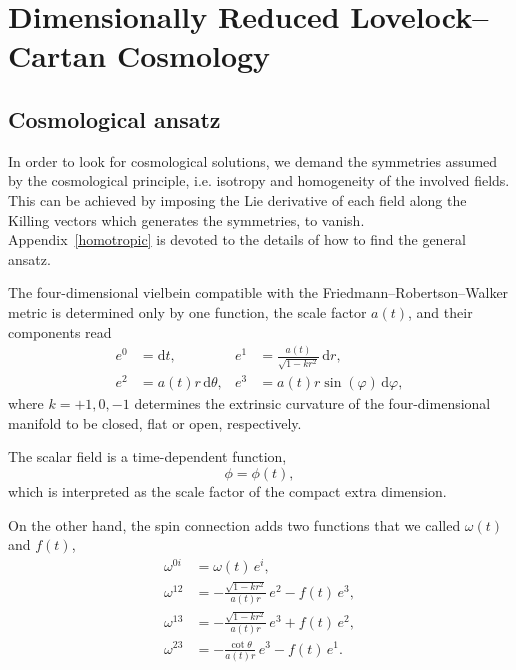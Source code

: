 \documentclass[aps,prd,12pt,superscriptaddress,showpacs,showkeys,longbibliography,reprint,nofootinbib]{revtex4-1}
\begin{document}
\section{Dimensionally Reduced Lovelock--Cartan Cosmology\label{cosmos}}

\subsection{Cosmological ansatz}

In order to look for cosmological solutions, we demand the symmetries assumed by the cosmological principle, i.e. isotropy and homogeneity of the involved fields. This can be achieved by imposing the Lie derivative of each field along the Killing vectors which generates the symmetries, to vanish. Appendix~\ref{homotropic} is devoted to the details of how to find the general ansatz.

The four-dimensional vielbein compatible with the Friedmann--Robertson--Walker metric is determined only by one function, the scale factor $a(t)$, and their components read
\begin{equation}
  \begin{aligned}
    \label{vielbein cosmo}
    e^0&=\mbox{d}t, & e^1&=\frac{a(t)}{\sqrt{1-kr^2}} \, \mbox{d}r,\\
    e^2&=a(t)r \, \mbox{d}\theta, & e^3&=a(t) r \sin(\varphi) \,\mbox{d}\varphi, 
  \end{aligned}
\end{equation}
where $k=+1,0,-1$ determines the extrinsic curvature of the four-dimensional manifold to be closed, flat or open, respectively. 

The scalar field is a time-dependent function, 
\begin{equation}
  \phi=\phi(t),
\end{equation}
which is interpreted as the scale factor of the compact extra dimension.

On the other hand, the spin connection adds two functions that we called $\omega(t)$ and $f(t)$,
\begin{align}
  \omega^{0i}&=\omega(t) \, e^i,\\
  \omega^{12}&=-\frac{\sqrt{1-kr^2}}{a(t)r} \, e^2 - f(t) \, e^3,\\
  \omega^{13}&=-\frac{\sqrt{1-kr^2}}{a(t)r} \, e^3 + f(t) \, e^2,\\
  \omega^{23}&=-\frac{\cot\theta}{a(t)r} \, e^3 - f(t) \, e^1.
\end{align}
\end{document}
